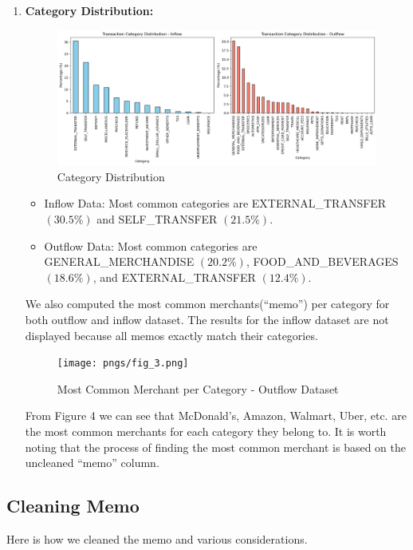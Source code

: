 \documentclass[12pt,letterpaper]{article}
\begin{document}
\begin{enumerate}
    \item{\textbf{Category Distribution:}}
    \begin{figure}[H]
        \centering
        \includegraphics[width=1.0\textwidth]{pngs/category_dist.png}
        \caption{Category Distribution}
        \label{fig:enter-label}
    \end{figure}
    \begin{itemize}
        \item Inflow Data: Most common categories are EXTERNAL\_TRANSFER $(30.5\%)$ and SELF\_TRANSFER $(21.5\%)$.
        \item Outflow Data: Most common categories are GENERAL\_MERCHANDISE $(20.2\%)$, FOOD\_AND\_BEVERAGES $(18.6\%)$, and EXTERNAL\_TRANSFER $(12.4\%)$.
    \end{itemize}

    {We also computed the most common merchants(“memo”) per category for both outflow and inflow dataset. The results for the inflow dataset are not displayed because all memos exactly match their categories.}
    \begin{figure}[H]
        \centering
        \texttt{[image: pngs/fig\_3.png]}
        \caption{Most Common Merchant per Category - Outflow Dataset}
        \label{fig:enter-label}
    \end{figure}
    {From Figure 4 we can see that McDonald’s, Amazon, Walmart, Uber, etc. are the most common merchants for each category they belong to. It is worth noting that the process of finding the most common merchant is based on the uncleaned “memo” column.}
\end{enumerate}

\subsection{Cleaning Memo}
Here is how we cleaned the memo and various considerations.
\end{document}
